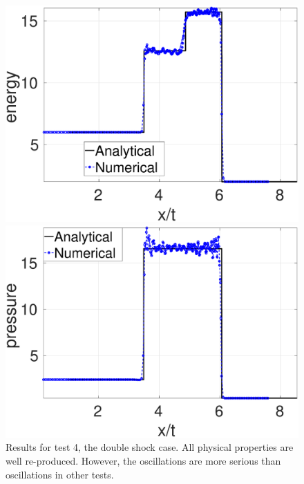 \begin{figure}
\begin{minipage}{.495\textwidth}
        \includegraphics[width=0.99 \textwidth]{Chapter-4/Figures/double_shock/Dshock-RCM-e-Rp6}
    \end{minipage}%
    \begin{minipage}{.495 \textwidth}
        \centering
        \includegraphics[width=0.99 \textwidth]{Chapter-4/Figures/double_shock/Dshock-RCM-p-Rp6}
    \end{minipage}%
    \caption{Results for test 4, the double shock case. All physical properties are well re-produced. However, the oscillations are more serious than oscillations in other tests.}
    \label{fig:RCM-double-shock}
\end{figure}

